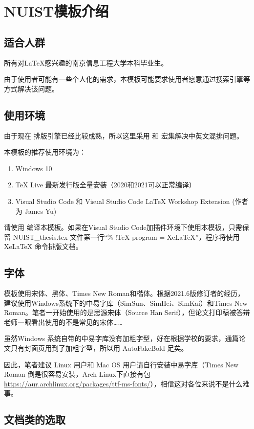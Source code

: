 \section{NUIST模板介绍}

\subsection{适合人群}
所有对\LaTeX 感兴趣的南京信息工程大学本科毕业生。

由于使用者可能有一些个人化的需求，本模板可能要求使用者愿意通过搜索引擎等方式解决该问题。

\subsection{使用环境}
由于现在 \XeTeX 排版引擎已经比较成熟，所以这里采用 \XeLaTeX{} 和 \CTeX{} 宏集解决中英文混排问题。

本模板的推荐使用环境为：
\begin{enumerate}[1、]
    \item Windows 10
    \item TeX Live 最新发行版全量安装（2020和2021可以正常编译）
    \item Visual Studio Code 和 Visual Studio Code LaTeX Workshop Extension (作者为 James Yu)
\end{enumerate}

请使用\XeLaTeX{} 编译本模板。如果在Visual Studio Code加插件环境下使用本模板，只需保留 NUIST\_thesis.tex 文件第一行“\% !TeX program  = XeLaTeX”，程序将使用XeLaTeX 命令排版文档。

\subsection{字体}
模板使用宋体、黑体、Times New Roman和楷体。根据2021.6版修订者的经历，建议使用Windows系统下的中易字库（SimSun、SimHei、SimKai）和Times New Roman。笔者一开始使用的是思源宋体（Source Han Serif），但论文打印稿被答辩老师一眼看出使用的不是常见的宋体……

虽然Windows 系统自带的中易字库没有加粗字型，好在根据学校的要求，通篇论文只有封面页用到了加粗字型，所以用 AutoFakeBold 足矣。

因此，笔者建议 Linux 用户和 Mac OS 用户请自行安装中易字库（Times New Roman 倒是很容易安装，Arch Linux下直接有包 \url{https://aur.archlinux.org/packages/ttf-ms-fonts/}），相信这对各位来说不是什么难事。

\subsection{文档类的选取}

